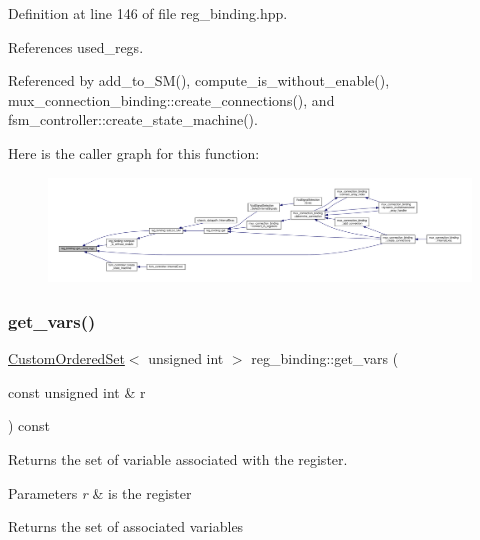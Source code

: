 Definition at line 146 of file reg\+\_\+binding.\+hpp.



References used\+\_\+regs.



Referenced by add\+\_\+to\+\_\+\+S\+M(), compute\+\_\+is\+\_\+without\+\_\+enable(), mux\+\_\+connection\+\_\+binding\+::create\+\_\+connections(), and fsm\+\_\+controller\+::create\+\_\+state\+\_\+machine().

Here is the caller graph for this function\+:
\nopagebreak
\begin{figure}[H]
\begin{center}
\leavevmode
\includegraphics[width=350pt]{da/d7c/classreg__binding_abd5a377a89a2590ab41f32bf54d5f8ae_icgraph}
\end{center}
\end{figure}
\mbox{\label{classreg__binding_a26f68e6f78394ba39512dc5a519a839e}} 
\subsubsection{\texorpdfstring{get\+\_\+vars()}{get\_vars()}}
{\footnotesize\ttfamily \hyperlink{classCustomOrderedSet}{Custom\+Ordered\+Set}$<$ unsigned int $>$ reg\+\_\+binding\+::get\+\_\+vars (\begin{DoxyParamCaption}\item[{const unsigned int \&}]{r }\end{DoxyParamCaption}) const\hspace{0.3cm}{\ttfamily [private]}}



Returns the set of variable associated with the register. 


\begin{DoxyParams}{Parameters}
{\em r} & is the register \\
\hline
\end{DoxyParams}
\begin{DoxyReturn}{Returns}
the set of associated variables 
\end{DoxyReturn}


